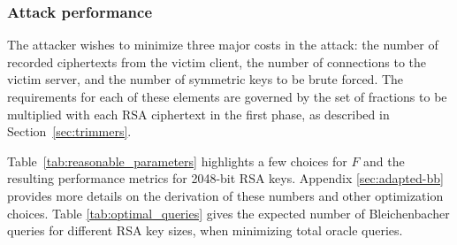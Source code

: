 \newcommand{\GPUTable}{
\begin{table*}[t]
 \centering
 \begin{tabular}{llrrrr}
        \toprule
        \textbf{Platform} & \textbf{Hardware} & \textbf{Cost} & \textbf{Full attack}  & \textbf{Cost to perform attack in 1 day} \\
        \midrule
        Na\"{\i}ve CPU & 4 Intel Xeon E7-4820 & $\$21,400$ & $114$ days  & \$$2,440,000$\\
        Na\"{\i}ve GPU & ZOTAC GeForce GTX TITAN & $\$2,400$  & $189$ days & \$$450,000$ \\
        Na\"{\i}ve FPGA & 64 Spartan-6 LX150 & $\$60,000$ & $51.5$ days  & \$$3,090,000$  \\
        \cmidrule{1-5}
        Optimized Hashcat & NVIDIA GTX / AMD R9 & \$18,040 & $0.75$ days & \$13,500 \\
        Optimized EC2 & NVIDIA & \$440 & $0.33$ days & \$147 \\
        \bottomrule
    \end{tabular}	
	\caption{\textbf{Time and cost efficiency of our attack on different hardware platforms.}\,---\,%
	The brute force attacks against symmetric export keys are the most expensive
	part of our attack. We compared the performance of a na\"{\i}ve
	implementation of our attack on different platforms, and decided that a GPU
	implementation held the most promise. We then heavily optimized our GPU
	implementation, obtaining several orders of magnitude in speedup.
	}
\label{perf_comparison}
\end{table*}
}

\subsubsection{Attack performance}
The attacker wishes to minimize three major costs in the attack: the number of recorded ciphertexts from the victim client, the number of connections to the victim server, and the number of symmetric keys to be brute forced.
The requirements for each of these elements are governed by the set of fractions to be multiplied with each RSA ciphertext in the first phase, as described in Section~\ref{sec:trimmers}.

Table~\ref{tab:reasonable_parameters} highlights a few choices for $F$ and the resulting performance metrics for 2048-bit RSA keys.
Appendix \ref{sec:adapted-bb} provides more details on the derivation of these numbers and other optimization choices.
Table \ref{tab:optimal_queries} gives the expected number of Bleichenbacher queries for different RSA key sizes, when minimizing total oracle queries.









